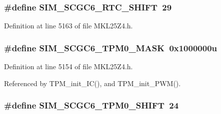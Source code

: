 \subsubsection[{\texorpdfstring{S\+I\+M\+\_\+\+S\+C\+G\+C6\+\_\+\+R\+T\+C\+\_\+\+S\+H\+I\+FT}{SIM_SCGC6_RTC_SHIFT}}]{\setlength{\rightskip}{0pt plus 5cm}\#define S\+I\+M\+\_\+\+S\+C\+G\+C6\+\_\+\+R\+T\+C\+\_\+\+S\+H\+I\+FT~29}\hypertarget{group___s_i_m___register___masks_gac04e5a3a7a2848658a30e7c89f791f39}{}\label{group___s_i_m___register___masks_gac04e5a3a7a2848658a30e7c89f791f39}


Definition at line 5163 of file M\+K\+L25\+Z4.\+h.

\subsubsection[{\texorpdfstring{S\+I\+M\+\_\+\+S\+C\+G\+C6\+\_\+\+T\+P\+M0\+\_\+\+M\+A\+SK}{SIM_SCGC6_TPM0_MASK}}]{\setlength{\rightskip}{0pt plus 5cm}\#define S\+I\+M\+\_\+\+S\+C\+G\+C6\+\_\+\+T\+P\+M0\+\_\+\+M\+A\+SK~0x1000000u}\hypertarget{group___s_i_m___register___masks_gad879476f2922fd7dad2f65d3d052e95d}{}\label{group___s_i_m___register___masks_gad879476f2922fd7dad2f65d3d052e95d}


Definition at line 5154 of file M\+K\+L25\+Z4.\+h.



Referenced by T\+P\+M\+\_\+init\+\_\+\+I\+C(), and T\+P\+M\+\_\+init\+\_\+\+P\+W\+M().

\subsubsection[{\texorpdfstring{S\+I\+M\+\_\+\+S\+C\+G\+C6\+\_\+\+T\+P\+M0\+\_\+\+S\+H\+I\+FT}{SIM_SCGC6_TPM0_SHIFT}}]{\setlength{\rightskip}{0pt plus 5cm}\#define S\+I\+M\+\_\+\+S\+C\+G\+C6\+\_\+\+T\+P\+M0\+\_\+\+S\+H\+I\+FT~24}\hypertarget{group___s_i_m___register___masks_ga9e379c439a6d1d14f65b4c58c46453c5}{}\label{group___s_i_m___register___masks_ga9e379c439a6d1d14f65b4c58c46453c5}


